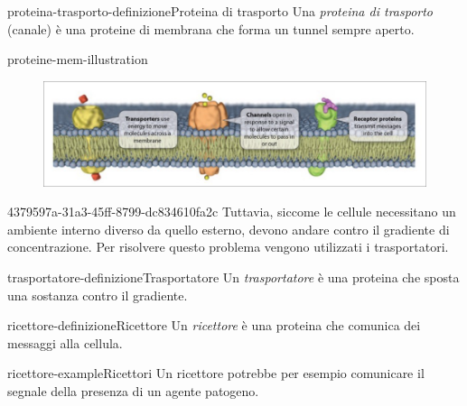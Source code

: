 \documentclass[preview]{standalone}
\begin{document}
\begin{snippetdefinition}{proteina-trasporto-definizione}{Proteina di trasporto}
    Una \textit{proteina di trasporto} (canale) è una proteine di membrana che forma un tunnel sempre aperto.
\end{snippetdefinition}


\begin{snippet}{proteine-mem-illustration}
    \begin{center}
    \begin{figure}[h]
        \centering
        \includegraphics[width=\textwidth]{./resources/proteine_mem.png}
    \end{figure}
    \end{center}
\end{snippet}

\begin{snippet}{4379597a-31a3-45ff-8799-dc834610fa2c}
    Tuttavia, siccome le cellule necessitano un ambiente interno diverso da quello esterno,
devono andare contro il gradiente di concentrazione.
Per risolvere questo problema vengono utilizzati i trasportatori.
\end{snippet}

\begin{snippetdefinition}{trasportatore-definizione}{Trasportatore}
    Un \textit{trasportatore} è una proteina che sposta una sostanza contro il gradiente.
\end{snippetdefinition}


\begin{snippetdefinition}{ricettore-definizione}{Ricettore}
    Un \textit{ricettore} è una proteina che comunica dei messaggi alla cellula.
\end{snippetdefinition}

\begin{snippetexample}{ricettore-example}{Ricettori}
    Un ricettore potrebbe per esempio comunicare il segnale della presenza di un agente patogeno.
\end{snippetexample}
\end{document}

